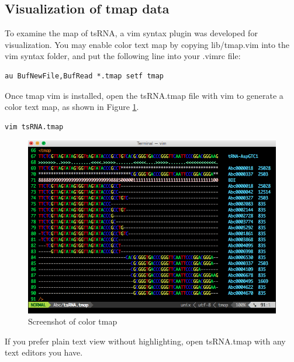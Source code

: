 \documentclass[11pt, a4paper]{article}
\begin{document}
\subsection{Visualization of tmap data}

To examine the map of tsRNA, a vim syntax plugin was developed for visualization. You may enable color text map by copying lib/tmap.vim into the vim syntax folder, and put the following line into your .vimrc file:

{\footnotesize \begin{tcolorbox}[colback=blue!5!white,colframe=pink!75!black,title=Set filetype tmap in vim]
\begin{verbatim}
au BufNewFile,BufRead *.tmap setf tmap
\end{verbatim}
\end{tcolorbox}}

Once tmap vim is installed, open the tsRNA.tmap file with vim to generate a color text map, as shown in Figure \ref{tmap}.

{\footnotesize \begin{tcolorbox}[colback=blue!5!white,colframe=pink!75!black,title=Visualization tsRNA.tmap]
\begin{verbatim}
vim tsRNA.tmap
\end{verbatim}
\end{tcolorbox}}

\begin{figure}[htbp]
\begin{center}
\includegraphics[width=12cm]{tmap.png}
\caption{Screenshot of color tmap} 
\label{tmap}
\end{center}
\end{figure}

If you prefer plain text view without highlighting, open tsRNA.tmap with any text editors you have.
\end{document}
